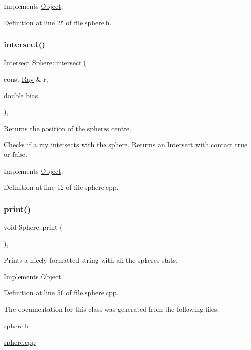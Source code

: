 Implements \mbox{\hyperlink{class_object_a71cb3da0e19b83f2558bf406abc9db68}{Object}}.



Definition at line 25 of file sphere.\+h.

\mbox{\label{class_sphere_a3ba8c2a4bc8108b244f35e71c14b952d}} 
\subsubsection{\texorpdfstring{intersect()}{intersect()}}
{\footnotesize\ttfamily \mbox{\hyperlink{struct_intersect}{Intersect}} Sphere\+::intersect (\begin{DoxyParamCaption}\item[{const \mbox{\hyperlink{struct_ray}{Ray}} \&}]{r,  }\item[{double}]{bias }\end{DoxyParamCaption})\hspace{0.3cm}{\ttfamily [override]}, {\ttfamily [virtual]}}



Returns the position of the sphere\textquotesingle{}s centre. 

Checks if a ray intersects with the sphere. Returns an \mbox{\hyperlink{struct_intersect}{Intersect}} with contact true or false. 

Implements \mbox{\hyperlink{class_object_a16d022cf54624baea89c542a44e6db26}{Object}}.



Definition at line 12 of file sphere.\+cpp.

\mbox{\label{class_sphere_a95537121c5308b7b250f4a53171303ef}} 
\subsubsection{\texorpdfstring{print()}{print()}}
{\footnotesize\ttfamily void Sphere\+::print (\begin{DoxyParamCaption}{ }\end{DoxyParamCaption})\hspace{0.3cm}{\ttfamily [override]}, {\ttfamily [virtual]}}



Prints a nicely formatted string with all the sphere\textquotesingle{}s stats. 



Implements \mbox{\hyperlink{class_object_ad81452e5a38455eff025d85ef1da7307}{Object}}.



Definition at line 56 of file sphere.\+cpp.



The documentation for this class was generated from the following files\+:\begin{DoxyCompactItemize}
\item 
\mbox{\hyperlink{sphere_8h}{sphere.\+h}}\item 
\mbox{\hyperlink{sphere_8cpp}{sphere.\+cpp}}\end{DoxyCompactItemize}

